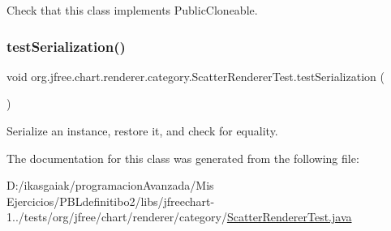 Check that this class implements Public\+Cloneable. \mbox{\label{classorg_1_1jfree_1_1chart_1_1renderer_1_1category_1_1_scatter_renderer_test_a7aa3e719c505525fa8b8c1172336e3ba}} 
\subsubsection{\texorpdfstring{test\+Serialization()}{testSerialization()}}
{\footnotesize\ttfamily void org.\+jfree.\+chart.\+renderer.\+category.\+Scatter\+Renderer\+Test.\+test\+Serialization (\begin{DoxyParamCaption}{ }\end{DoxyParamCaption})}

Serialize an instance, restore it, and check for equality. 

The documentation for this class was generated from the following file\+:\begin{DoxyCompactItemize}
\item 
D\+:/ikasgaiak/programacion\+Avanzada/\+Mis Ejercicios/\+P\+B\+Ldefinitibo2/libs/jfreechart-\/1../tests/org/jfree/chart/renderer/category/\mbox{\hyperlink{_scatter_renderer_test_8java}{Scatter\+Renderer\+Test.\+java}}\end{DoxyCompactItemize}
